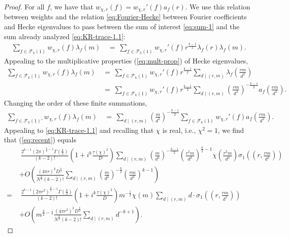 \documentclass[12pt, reqno,oneside]{amsart}
\theoremstyle{plain}
\theoremstyle{definition}
\theoremstyle{remark}
\theoremstyle{plain}
\numberwithin{equation}{section}
\begin{document}
\begin{proof}
For all $f$, we have that $w_{\chi,r}(f)=w_{\chi,r}'(f)a_f(r)$. We use this relation between weights and the relation \eqref{eq:Fourier-Hecke} between Fourier coefficients and Hecke eigenvalues to pass between the sum of interest \eqref{eq:sum-1} and the sum already analyzed \eqref{eq:KR-trace-1.1}:
\begin{align}
\sum_{f\in\mathcal{F}_k(1)}w_{\chi,r}(f)\lambda_f(m) \ 
&= \ \sum_{f\in\mathcal{F}_k(1)}w_{\chi,r}'(f)r^{\frac{k-1}{2}}\lambda_f(r)\lambda_f(m).
\end{align}
Appealing to the multiplicative properties (\ref{eq:mult-prop}) of Hecke eigenvalues,
\begin{align}
\sum_{f\in\mathcal{F}_k(1)}w_{\chi,r}(f)\lambda_f(m) \ 
&= \ \sum_{f\in\mathcal{F}_k(1)}w_{\chi,r}'(f)r^{\frac{k-1}{2}}\sum_{d\mid(r,m)}\lambda_f\left(\frac{rm}{d^2}\right) \\
&= \ \sum_{f\in\mathcal{F}_k(1)}w_{\chi,r}'(f)r^{\frac{k-1}{2}}\sum_{d\mid(r,m)}\left(\frac{rm}{d^2}\right)^{-\frac{k-1}{2}}a_f\left(\frac{rm}{d^2}\right).
\end{align}
Changing the order of these finite summations,
\begin{align}
\label{eq:recent}
\sum_{f\in\mathcal{F}_k(1)'}w_{\chi,r}(f)\lambda_f(m) \
&= \ \sum_{d\mid(r,m)} \left(\frac{m}{d^2}\right)^{-\frac{k-1}{2}}\sum_{f\in\mathcal{F}_k(1)}w_{\chi,r}'(f)a_f\left(\frac{rm}{d^2}\right).
\end{align}
Appealing to \eqref{eq:KR-trace-1.1} and recalling that $\chi$ is real, i.e., $\chi^2=1$, we find that (\ref{eq:recent}) equals
\begin{align}
\nonumber
&\ \frac{2^{k-1}(2\pi)^{\frac{k}{2}-1}\Gamma\left(\frac{k}{2}\right)}{(k-2)!}\left(1+i^k\frac{\tau(\chi)^2}{D}\right)\sum_{d\mid(r,m)}\left(\frac{m}{d^2}\right)^{-\frac{k-1}{2}}\left(\frac{r^2m}{d^2}\right)^{\frac{k}{2}-1}\chi\left(\frac{r^2m}{d^2}\right)\sigma_1\left(\left(r,\frac{rm}{d^2}\right)\right)\\
\nonumber
&+O\left(\frac{(4\pi r)^{k}D^{\frac{k}{2}}}{N^{\frac{k}{2}}(k-2)!}\sum_{d\mid(r,m)}\left(\frac{m}{d^2}\right)^{-\frac{k}{2}}\left(\frac{rm}{d^2}\right)^{k-1}\right) \\
\nonumber
= \ & \ \frac{2^{k-1}(2\pi r^2)^{\frac{k}{2}-1}\Gamma\left(\frac{k}{2}\right)}{(k-2)!}\left(1+i^k\frac{\tau(\chi)^2}{D}\right)m^{-\frac{1}{2}}\chi(m)\sum_{d\mid(r,m)}d \cdot \sigma_1\left(\left(r,\frac{rm}{d^2}\right)\right)\\
\label{eq:final-asymp}
&+O\left(m^{\frac{k}{2}-1}\frac{(4\pi r^2)^{k}D^{\frac{k}{2}}}{N^{\frac{k}{2}}(k-2)!}\sum_{d\mid(r,m)}d^{-k+1}\right).

\end{align}
\end{proof}
\end{document}
